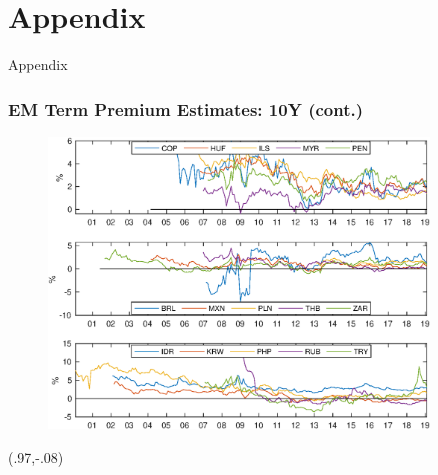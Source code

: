\documentclass[12pt, aspectratio=169, xcolor=dvipsnames]{beamer} 			         %
\begin{document}
\section{Appendix}

\begin{frame}
	\begin{center}
		\huge \textcolor{yaleblue}{Appendix}
	\end{center}
\end{frame}

\begin{frame}[label=tp_10yrB]
	\frametitle{EM Term Premium Estimates: 10Y (cont.)}
	\begin{figure}[!htbp]
		\begin{center} %
			\includegraphics[trim={0 0 0 4cm},clip, width=0.9\textwidth,height=0.65\textheight]{../Figures/Temp/temp_tp10yrEM}
			\par\end{center}
	\end{figure}
	\begin{textblock*}{3cm}(.97\textwidth,-.08\textheight)
		\hyperlink{tp_10yrA}{}
	\end{textblock*}
\end{frame}
\end{document}
